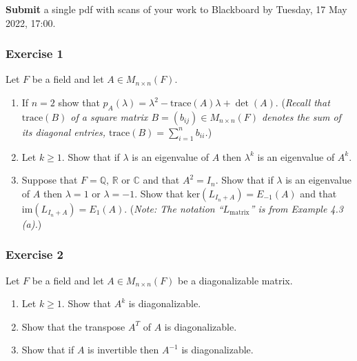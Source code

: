 \documentclass[
  12pt,
  a4paper,
  twoside]{article}
\theoremstyle{plain}
\theoremstyle{definition}
\begin{document}
\textbf{Submit} a single pdf with scans of your work to Blackboard by Tuesday, 17 May 2022, 17:00.

\hypertarget{exercise-1-8}{%
\subsubsection*{Exercise 1}\label{exercise-1-8}}

Let \(F\) be a field and let \(A \in M_{n\times n}(F)\).

\begin{enumerate}
\def\labelenumi{(\alph{enumi})}
\item
  If \(n=2\) show that \(p_A(\lambda) = \lambda^2 - \textrm{trace}(A) \lambda + \det(A)\).
  (\emph{Recall that \(\textrm{trace}(B)\) of a square matrix \(B=(b_{ij})\in M_{n\times n}(F)\) denotes the sum of its diagonal entries, \(\textrm{trace}(B)=\sum_{i=1}^nb_{ii}\).})
\item
  Let \(k \ge 1\). Show that if \(\lambda\) is an eigenvalue of \(A\)
  then \(\lambda^k\) is an eigenvalue of \(A^k\).
\item
  Suppose that \(F = \mathbb{Q}\), \(\mathbb{R}\) or \(\mathbb{C}\) and that \(A^2 = I_n\).
  Show that if \(\lambda\) is an eigenvalue of \(A\) then \(\lambda = 1\)
  or \(\lambda = -1\).
  Show that \(\textrm{ker}(L_{I_n +A}) = E_{-1}(A)\) and that \(\textrm{im}(L_{I_n+A}) = E_1(A)\).
  (\emph{Note: The notation ``\(L_{\mathrm{matrix}}\)'' is from Example 4.3 (a).})
\end{enumerate}

\hypertarget{exercise-2-8}{%
\subsubsection*{Exercise 2}\label{exercise-2-8}}

Let \(F\) be a field and let \(A \in M_{n\times n}(F)\) be a
diagonalizable matrix.

\begin{enumerate}
\def\labelenumi{(\alph{enumi})}
\item
  Let \(k\ge 1\). Show that \(A^k\) is diagonalizable.
\item
  Show that the transpose \(A^T\) of \(A\) is diagonalizable.
\item
  Show that if \(A\) is invertible then \(A^{-1}\) is
  diagonalizable.
\end{enumerate}
\end{document}
